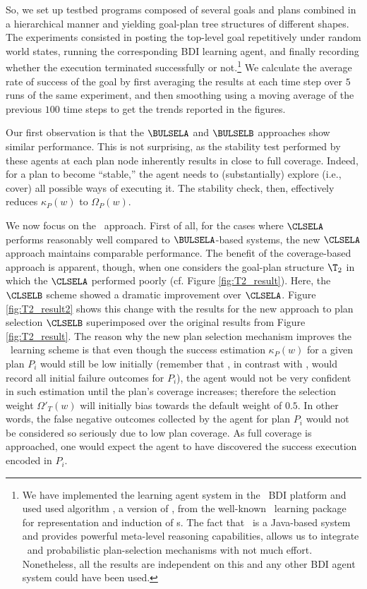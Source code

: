 So, we set up testbed programs composed of several goals and plans combined in a
hierarchical manner and yielding goal-plan tree structures of different shapes.
The experiments consisted in posting the top-level goal repetitively under random
world states, running the corresponding  BDI learning agent, and finally
recording whether the execution terminated successfully or not.\footnote{We have
implemented the learning agent system in the \JACK\ BDI platform
\cite{BusettaRHL:AL99-JACK} and used used algorithm , a version
of  \cite{Mitchell97:ML}, from the well-known \weka\ learning
package \cite{weka99} for representation and induction of \dt{}s. The fact that
\JACK\ is a Java-based system and provides powerful meta-level reasoning
capabilities, allows us to integrate \weka\ and probabilistic plan-selection
mechanisms with not much effort. Nonetheless, all the results are independent on
this and any other BDI agent system could have been used.}
We calculate the average rate of success of the goal by first averaging the
results at each time step over $5$ runs of the same experiment, and then
smoothing using a moving average of the previous $100$ time steps to get the
trends reported in the figures.


Our first observation is that the $\BULSELA$ and $\BULSELB$ approaches show
similar performance.
This is not surprising, as the stability test performed by these agents at each
plan node inherently results in close to full coverage. Indeed, for a plan to
become ``stable,'' the agent needs to (substantially) explore (i.e., cover) all
possible ways of executing it. The stability check, then, effectively reduces
$\kappa_P(w)$ to $\Omega_P(w)$.



We now focus on the \CL\ approach.
First of all, for the cases where $\CLSELA$ performs reasonably well compared to
$\BULSELA$-based systems, the new $\CLSELA$ approach maintains comparable
performance.
The benefit of the coverage-based approach is apparent, though, when one
considers the goal-plan structure $\T_2$ in which the $\CLSELA$ performed
poorly (cf. Figure \ref{fig:T2_result}).
Here, the $\CLSELB$ scheme showed a dramatic improvement over $\CLSELA$. Figure
\ref{fig:T2_result2} shows this change with the results for the new approach to
plan selection $\CLSELB$ superimposed over the original results
from Figure \ref{fig:T2_result}.
The reason why the new plan selection mechanism improves the \CL\ learning scheme
is that even though the success estimation $\kappa_P(w)$ for a given plan $P_i$ would
still be low initially (remember that \CL, in contrast with \BUL, would record
all initial failure outcomes for $P_i$), the agent would not be very confident in
such estimation until the plan's coverage increases; therefore the
selection weight $\Omega'_T(w)$ will initially bias towards the default weight of
$0.5$. In other words, the false negative outcomes collected by the agent for
plan $P_i$ would not be considered so seriously due to low plan coverage. As full
coverage is approached, one would expect the agent to have discovered the success
execution encoded in $P_i$.



